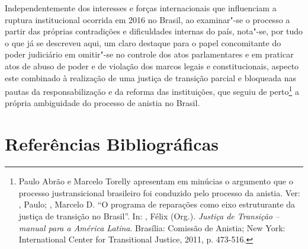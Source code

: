Independentemente dos interesses e forças internacionais que influenciam
a ruptura institucional ocorrida em 2016 no Brasil, ao examinar"-se o
processo a partir das próprias contradições e dificuldades internas do
país, nota"-se, por tudo o que já se descreveu aqui, um claro destaque
para o papel concomitante do poder judiciário em omitir"-se no controle
dos atos parlamentares e em praticar atos de abuso de poder e de
violação dos marcos legais e constitucionais, aspecto este combinado à
realização de uma justiça de transição parcial e bloqueada nas pautas da
responsabilização e da reforma das instituições, que seguiu de
perto\footnote{Paulo Abrão e Marcelo Torelly apresentam em minúcias o
  argumento que o processo justransicional brasileiro foi conduzido pelo
  processo da anistia. Ver: , Paulo; , Marcelo D.
  ``O programa
  de reparações como eixo estruturante da justiça de transição no
  Brasil''. In: , Félix (Org.). \emph{Justiça de Transição --
  manual para a América Latina}. Brasília: Comissão de Anistia; New York:
  International Center for Transitional Justice, 2011, p. 473-516.} a
própria ambiguidade do processo de anistia no Brasil.

\section{Referências Bibliográficas}

